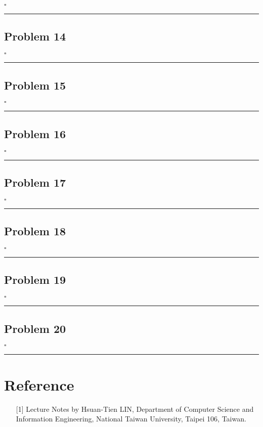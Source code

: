\documentclass[12pt]{article}
\newcommand*{\QEDB}{\hfill\ensuremath{\square}}
\newcommand{\horrule}[1]{\rule{\linewidth}{#1}}
\begin{document}
\QEDB

\horrule{0.5pt}

\subsection*{Problem 14}

\QEDB

\horrule{0.5pt}

\subsection*{Problem 15}

\QEDB

\horrule{0.5pt}

\subsection*{Problem 16}

\QEDB

\horrule{0.5pt}

\subsection*{Problem 17}

\QEDB

\horrule{0.5pt}

\subsection*{Problem 18}

\QEDB

\horrule{0.5pt}

\subsection*{Problem 19}

\QEDB

\horrule{0.5pt}

\subsection*{Problem 20}

\QEDB

\horrule{0.5pt}

\section*{Reference}

\begin{enumerate}

\item[{[1]}] Lecture Notes by Hsuan-Tien LIN, Department of Computer Science and Information Engineering, National Taiwan University, Taipei 106, Taiwan.

\end{enumerate}
\end{document}
